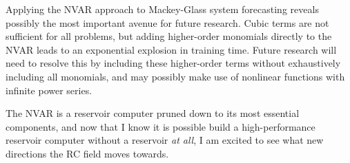 Applying the NVAR approach to Mackey-Glass system forecasting reveals
possibly the most important avenue for future research. Cubic terms
are not sufficient for all problems, but adding higher-order monomials
directly to the NVAR leads to an exponential explosion in training
time. Future research will need to resolve this by including these
higher-order terms without exhaustively including all monomials, and
may possibly make use of nonlinear functions with infinite power
series.

The NVAR is a reservoir computer pruned down to its most essential
components, and now that I know it is possible build a high-performance reservoir computer
without a reservoir \emph{at all}, I am excited to see what new
directions the RC field moves towards.
